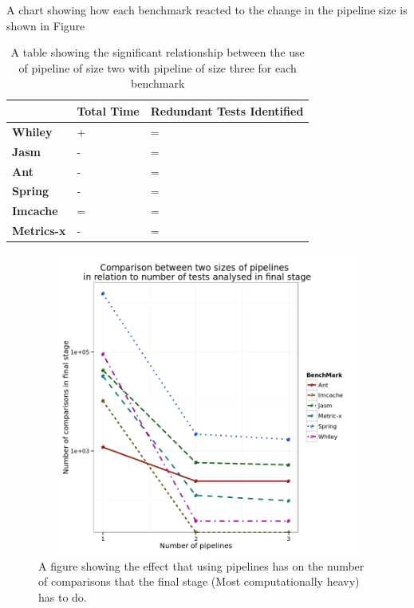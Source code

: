 A chart showing how each benchmark reacted to the change in the pipeline size is shown in Figure 

\begin{table}[H]
\centering

\label{pipelinesig}
\begin{tabular}{|l|l|l|}
\hline
{\bf }          & {\bf Total Time} & {\bf Redundant Tests Identified} \\ \hline
{\bf Whiley}    & +                & =                           \\ \hline
{\bf Jasm}      & -                & =                           \\ \hline
{\bf Ant}       & -                & =                           \\ \hline
{\bf Spring}    & -                & =                           \\ \hline
{\bf Imcache}   & =                & =                           \\ \hline
{\bf Metrics-x} & -                & =                           \\ \hline
\end{tabular}
\caption{A table showing the significant relationship between the use of pipeline of size two with pipeline of size three for each benchmark}
\end{table}

\begin{figure}[H]
\begin{center}
\includegraphics[height=10cm, width = 14.5cm]{Pipeline.png}
\end{center}
\caption{A figure showing the effect that using pipelines has on the number of comparisons that the final stage (Most computationally heavy) has to do.}
\label{fig:pipelinegraph}
\end{figure}


